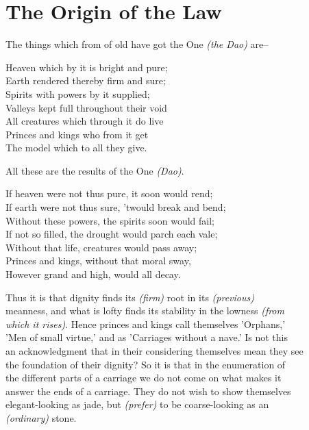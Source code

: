 \section*{The Origin of the Law}
    The things which from of old have got the One \textit{(the Dao)} are--\vspace{\baselineskip}
    
    Heaven which by it is bright and pure;\\
    Earth rendered thereby firm and sure;\\
    Spirits with powers by it supplied;\\
    Valleys kept full throughout their void\\
    All creatures which through it do live\\
    Princes and kings who from it get\\
    The model which to all they give.\vspace{\baselineskip}
    
    All these are the results of the One \textit{(Dao)}.\vspace{\baselineskip}
    
    If heaven were not thus pure, it soon would rend;\\
    If earth were not thus sure, 'twould break and bend;\\
    Without these powers, the spirits soon would fail;\\
    If not so filled, the drought would parch each vale;\\
    Without that life, creatures would pass away;\\
    Princes and kings, without that moral sway,\\
    However grand and high, would all decay.\vspace{\baselineskip}
    
    Thus it is that dignity finds its \textit{(firm)} root in its \textit{(previous)}\\
    meanness, and what is lofty finds its stability in the lowness \textit{(from\\
    which it rises)}. Hence princes and kings call themselves 'Orphans,'\\
    'Men of small virtue,' and as 'Carriages without a nave.' Is not this\\
    an acknowledgment that in their considering themselves mean they see\\
    the foundation of their dignity? So it is that in the enumeration of\\
    the different parts of a carriage we do not come on what makes it\\
    answer the ends of a carriage. They do not wish to show themselves\\
    elegant-looking as jade, but \textit{(prefer)} to be coarse-looking as an\\
    \textit{(ordinary)} stone.\vspace{\baselineskip}
    
